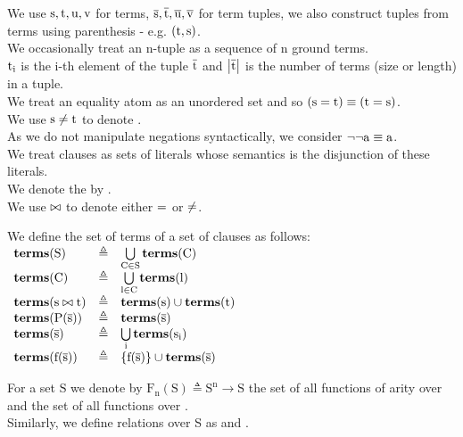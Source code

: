 \noindent
We use $\mathrm{s,t,u,v}$ for terms, $\mathrm{\mathrm{\overline{s}},\mathrm{\overline{t}},\mathrm{\overline{u}},\mathrm{\overline{v}}}$ for term tuples,
we also construct tuples from terms using parenthesis - e.g. $\mathrm{(t,s)}$.\\
We occasionally treat an n-tuple as a sequence of n ground terms.\\
$\mathrm{t}_{\mathrm{i}}$ is the i-th element of the tuple $\mathrm{\overline{t}}$ and $\left|\mathrm{\overline{t}}\right|$ is the number of terms (size or length) in a tuple. \\
We treat an equality atom as an unordered set and so $\mathrm{(s=t)} \equiv \mathrm{(t=s)}$.\\
We use $\mathrm{s \neq t}$ to denote .\\
As we do not manipulate negations syntactically, we consider $\mathrm{\lnot \lnot a \equiv a}$.\\
We treat clauses as sets of literals whose semantics is the disjunction of these literals.\\
We denote the  by \newdef{\emptyClause}.\\
We use $\mathrm{\bowtie}$ to denote either $\mathrm{=}$ or $\mathrm{\neq}$.

\noindent
We define the set of terms  of a set of clauses as follows:\\
$
\begin{array}{llll}
\mathbf{terms}(\mathrm{S})           & \triangleq & \bigcup\limits_{\mathrm{C} \in \mathrm{S}} \mathbf{terms}(\mathrm{C}) \\ 
\mathbf{terms}(\mathrm{C})           & \triangleq & \bigcup\limits_{\mathrm{l} \in \mathrm{C}} \mathbf{terms}(\mathrm{l}) \\ 
\mathbf{terms}(\mathrm{s \bowtie t}) & \triangleq & \mathbf{terms}(\mathrm{s}) \cup \mathbf{terms}(\mathrm{t}) \\ 
\mathbf{terms}(\mathrm{\mathrm{P}(\mathrm{\overline{s}})})   & \triangleq & \mathbf{terms}(\mathrm{\mathrm{\overline{s}}}) \\ 
\mathbf{terms}(\mathrm{\mathrm{\overline{s}}})     & \triangleq & \mathrm{\bigcup\limits_{i} \mathbf{terms}(\mathrm{\mathrm{s}_{\mathrm{i}}})} \\ 
\mathbf{terms}(\mathrm{\mathrm{f}(\mathrm{\overline{s}})})   & \triangleq & \left\{\mathrm{\mathrm{f}(\mathrm{\overline{s}})}\right\} \cup \mathbf{terms}(\mathrm{\mathrm{\overline{s}}}) \\
\end{array}
$

\noindent
For a set $\mathrm{S}$ we denote by $\mathrm{F_n(S)} \triangleq \mathrm{S^n} \rightarrow \mathrm{S}$ the set of all functions of arity  over  and  the set of all functions over .\\
Similarly, we define relations over S as  and .

